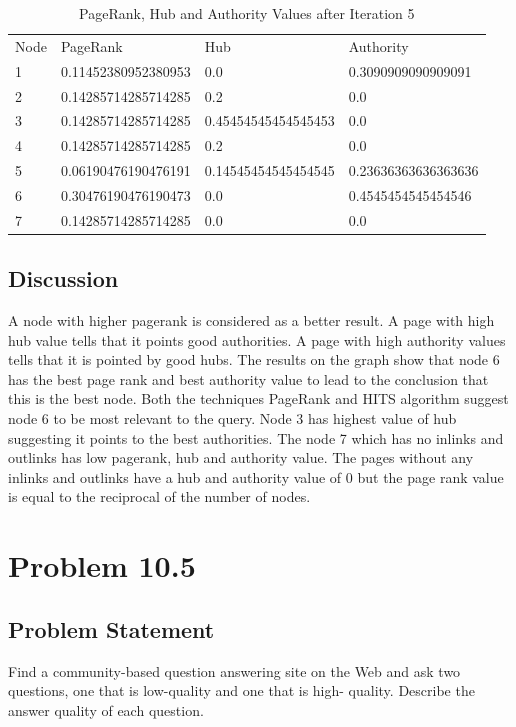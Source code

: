 \documentclass[12pt]{report}
\begin{document}
\begin{table}[]
\centering
\caption{PageRank, Hub and Authority Values after Iteration 5}
\label{my-label}
\begin{tabular}{llll}
Node & PageRank            & Hub                 & Authority           \\
1    & 0.11452380952380953 & 0.0                 & 0.3090909090909091  \\
2    & 0.14285714285714285 & 0.2                 & 0.0                 \\
3    & 0.14285714285714285 & 0.45454545454545453 & 0.0                 \\
4    & 0.14285714285714285 & 0.2                 & 0.0                 \\
5    & 0.06190476190476191 & 0.14545454545454545 & 0.23636363636363636 \\
6    & 0.30476190476190473 & 0.0                 & 0.4545454545454546  \\
7    & 0.14285714285714285 & 0.0                 & 0.0                
\end{tabular}
\end{table}

\section{Discussion}
A node with higher pagerank  is considered as a better result. A page with high hub value tells that it points good authorities. A page with high authority values tells that it is pointed by good hubs. The results on the graph show that node 6 has the best page rank and best authority value to lead to the conclusion that this is the best node. Both the techniques PageRank and HITS algorithm suggest node 6 to be most relevant to the query. Node 3 has highest value of hub suggesting it points to the best authorities. The node 7 which has no inlinks and outlinks has low pagerank, hub and authority value. The pages without any inlinks and outlinks have a hub and authority value of 0 but the page rank value is equal to the reciprocal of the number of nodes. 

\chapter{Problem 10.5}
\section{Problem Statement}
Find a community-based question answering site on the Web and ask two questions, one that is low-quality and one that is high- quality. Describe the answer quality of each question.
\end{document}
